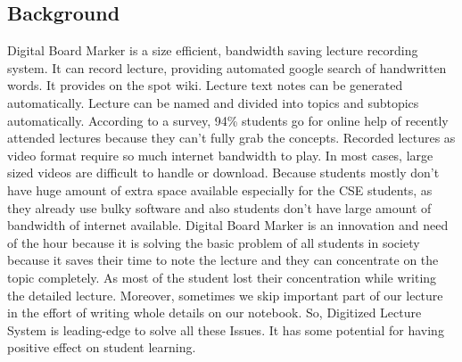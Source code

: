 \documentclass[12pt]{article}
\begin{document}
\subsection{Background}
Digital Board Marker is a size efficient, bandwidth saving lecture recording system. It can record lecture, providing automated google search of handwritten words. It provides on the spot wiki. Lecture text notes can be generated automatically. Lecture can be named and divided into topics and subtopics automatically. According to a survey, 94\% students go for online help of recently attended lectures because they can’t fully grab the concepts. Recorded lectures as video format require so much internet bandwidth to play. In most cases, large sized videos are difficult to handle or download. Because students mostly don’t have huge amount of extra space available especially for the CSE students, as they already use bulky software and also students don’t have large amount of bandwidth of internet available.
Digital Board Marker is an innovation and need of the hour because it is solving the basic problem of all students in society because it saves their time to note the lecture and they can concentrate on the topic completely. As most of the student lost their concentration while writing the detailed lecture. Moreover, sometimes we skip important part of our lecture in the effort of writing whole details on our notebook. So, Digitized Lecture System is leading-edge to solve all these Issues. It has some potential for having positive effect on student learning.
\end{document}
